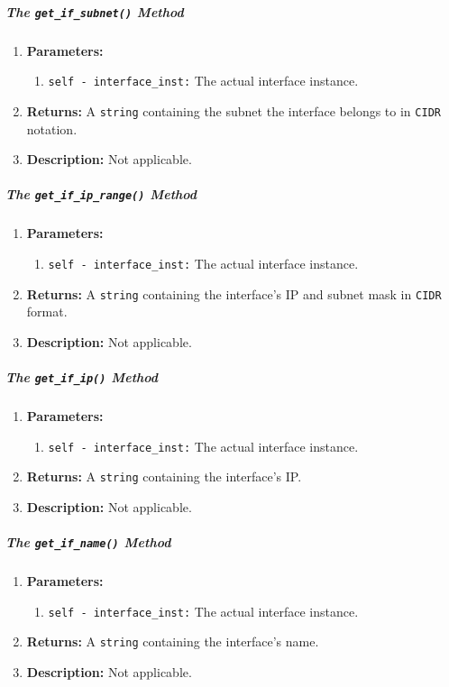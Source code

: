         \subparagraph{The \texttt{get\_if\_subnet()} Method}
            \begin{enumerate}
                \item \textbf{Parameters:}
                \begin{enumerate}
                    \item \texttt{self - interface\_inst:} The actual interface instance.
                \end{enumerate}
                \item \textbf{Returns:} A \texttt{string} containing the subnet the interface belongs to in \texttt{CIDR} notation.
                \item \textbf{Description:} Not applicable.
            \end{enumerate}

        \subparagraph{The \texttt{get\_if\_ip\_range()} Method}
            \begin{enumerate}
                \item \textbf{Parameters:}
                \begin{enumerate}
                    \item \texttt{self - interface\_inst:} The actual interface instance.
                \end{enumerate}
                \item \textbf{Returns:} A \texttt{string} containing the interface's IP and subnet mask in \texttt{CIDR} format.
                \item \textbf{Description:} Not applicable.
            \end{enumerate}

        \subparagraph{The \texttt{get\_if\_ip()} Method}
            \begin{enumerate}
                \item \textbf{Parameters:}
                \begin{enumerate}
                    \item \texttt{self - interface\_inst:} The actual interface instance.
                \end{enumerate}
                \item \textbf{Returns:} A \texttt{string} containing the interface's IP.
                \item \textbf{Description:} Not applicable.
            \end{enumerate}

        \subparagraph{The \texttt{get\_if\_name()} Method}
            \begin{enumerate}
                \item \textbf{Parameters:}
                \begin{enumerate}
                    \item \texttt{self - interface\_inst:} The actual interface instance.
                \end{enumerate}
                \item \textbf{Returns:} A \texttt{string} containing the interface's name.
                \item \textbf{Description:} Not applicable.
            \end{enumerate}

